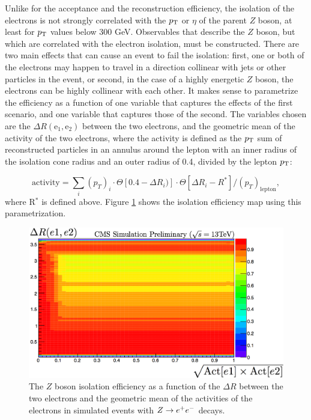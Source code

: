 {Unlike for the acceptance and the reconstruction efficiency, the isolation of the electrons is not strongly correlated with the $p_{\text{T}}$ or $\eta$ of the parent $Z$ boson, at least for $p_{\text{T}}$ values below 300 GeV. Observables that describe the $Z$ boson, but which are correlated with the electron isolation, must be constructed. There are two main effects that can cause an event to fail the isolation: first, one or both of the electrons may happen to travel in a direction collinear with jets or other particles in the event, or second, in the case of a highly energetic $Z$ boson, the electrons can be highly collinear with each other. It makes sense to parametrize the efficiency as a function of one variable that captures the effects of the first scenario, and one variable that captures those of the second. The variables chosen are the $\Delta R (\text{e}_1, \text{e}_2)$ between the two electrons, and the geometric mean of the activity of the two electrons, where the activity is defined as the $p_{\text{T}}$ sum of reconstructed particles in an annulus around the lepton with an inner radius of the isolation cone radius and an outer radius of 0.4, divided by the lepton $p_{\text{T}}$:

\begin{equation}
\text{activity} = \sum_{i}(p_{T})_i \cdot \Theta[0.4-\Delta R_{i})] \cdot \Theta[\Delta R_{i}-R^*]/(p_T)_{\text{lepton}},
\end{equation}
where R$^*$ is defined above.
Figure \ref{fig:ZeeIsolation} shows the isolation efficiency map using this parametrization. 
\begin{figure}[tb!]
\centering
\includegraphics[width=0.7\linewidth]{figures/SusySearches/HadStop2015/ZeeIsolation.png}
\caption{The $Z$ boson isolation efficiency as a function of the $\Delta R$ between the two electrons and the geometric mean of the activities of the electrons in simulated events with $Z\rightarrow e^+e^-$ decays.}
\label{fig:ZeeIsolation}
\end{figure}
\FloatBarrier

}
